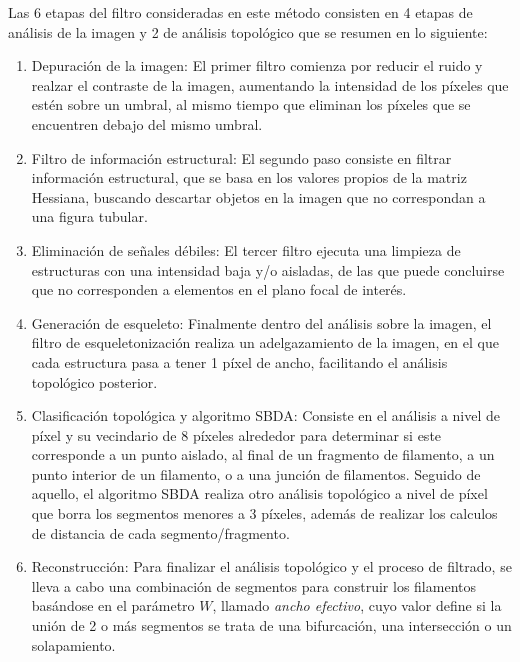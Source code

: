 Las 6 etapas del filtro consideradas en este m\'etodo consisten en 4 etapas de an\'alisis de la imagen y 2 de an\'alisis topol\'ogico que se resumen en lo siguiente:

\begin{enumerate}
    \item Depuraci\'on de la imagen: El primer filtro comienza por reducir el ruido y realzar el contraste de la imagen, aumentando la intensidad de los p\'ixeles que est\'en sobre un umbral, al mismo tiempo que eliminan los p\'ixeles que se encuentren debajo del mismo umbral.
    \item Filtro de informaci\'on estructural: El segundo paso consiste en filtrar informaci\'on estructural, que se basa en los valores propios de la matriz Hessiana, buscando descartar objetos en la imagen que no correspondan a una figura tubular.
    \item Eliminaci\'on de se\~nales d\'ebiles: El tercer filtro ejecuta una limpieza de estructuras con una intensidad baja y/o aisladas, de las que puede concluirse que no corresponden a elementos en el plano focal de inter\'es.
    \item Generaci\'on de esqueleto: Finalmente dentro del an\'alisis sobre la imagen, el filtro de esqueletonizaci\'on realiza un adelgazamiento de la imagen, en el que cada estructura pasa a tener 1 p\'ixel de ancho, facilitando el an\'alisis topol\'ogico posterior.
    \item Clasificaci\'on topol\'ogica y algoritmo SBDA: Consiste en el an\'alisis a nivel de p\'ixel y su vecindario de 8 p\'ixeles alrededor para determinar si este corresponde a un punto aislado, al final de un fragmento de filamento, a un punto interior de un filamento, o a una junci\'on de filamentos. Seguido de aquello, el algoritmo SBDA realiza otro an\'alisis topol\'ogico a nivel de p\'ixel que borra los segmentos menores a 3 p\'ixeles, adem\'as de realizar los calculos de distancia de cada segmento/fragmento.
    \item Reconstrucci\'on: Para finalizar el an\'alisis topol\'ogico y el proceso de filtrado, se lleva a cabo una combinaci\'on de segmentos para construir los filamentos bas\'andose en el par\'ametro $W$, llamado \textit{ancho efectivo}, cuyo valor define si la uni\'on de 2 o m\'as segmentos se trata de una bifurcaci\'on, una intersecci\'on o un solapamiento. 
\end{enumerate}

